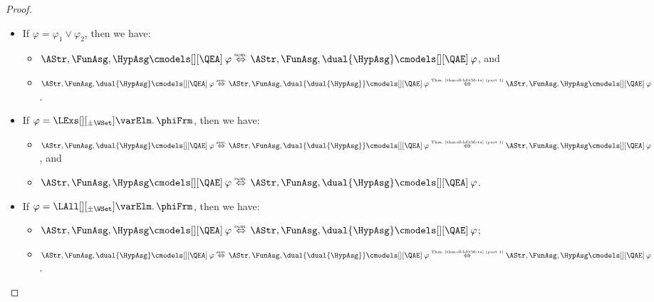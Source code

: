 \documentclass[authoryear]{elsarticle}
\newcommand{\iffExpl}[1]{\mathrel{\stackrel{\text{\tiny #1}}{\Leftrightarrow}}}
\begin{document}
\begin{proof}
\begin{itemize}
\begin{itemize}
    \end{itemize}

  \item If $\varphi = \varphi_1 \vee \varphi_2$, then we have:
    \begin{itemize}
    \item $\AStr, \FunAsg, \HypAsg \cmodels[][\QEA]\: \varphi \iffExpl{sem.}
      \AStr, \FunAsg, \dual{\HypAsg} \cmodels[][\QAE]\: \varphi$, and

    \item $\AStr, \FunAsg, \dual{\HypAsg} \cmodels[][\QEA]\: \varphi
      \iffExpl{sem.}  \AStr, \FunAsg, \dual{\dual{\HypAsg}} \cmodels[][\QAE]\:
      \varphi \iffExpl{Thm.~\ref{thm:dbldltMeta} (part 1)} \AStr, \FunAsg,
      \HypAsg \cmodels[][\QAE]\: \varphi$.

    \end{itemize}

  \item If $\varphi = \LExs[][_{\pm\WSet}] \varElm \ldotp \phiFrm$, then we
    have:
    \begin{itemize}
    \item $\AStr, \FunAsg, \dual{\HypAsg} \cmodels[][\QAE]\: \varphi
      \iffExpl{sem.}\AStr, \FunAsg, \dual{\dual{\HypAsg}} \cmodels[][\QEA]\:
      \varphi \iffExpl{Thm.~\ref{thm:dbldltMeta} (part 1)} \AStr, \FunAsg,
      \HypAsg \cmodels[][\QEA]\: \varphi$, and

    \item $\AStr, \FunAsg, \HypAsg \cmodels[][\QAE]\: \varphi \iffExpl{sem.}
      \AStr, \FunAsg, \dual{\HypAsg} \cmodels[][\QEA]\: \varphi$.
    \end{itemize}

  \item If $\varphi = \LAll[][_{\pm\WSet}] \varElm \ldotp \phiFrm$, then we
    have:
    \begin{itemize}
    \item $\AStr, \FunAsg, \HypAsg \cmodels[][\QEA]\: \varphi \iffExpl{sem.}
      \AStr, \FunAsg, \dual{\HypAsg} \cmodels[][\QAE]\: \varphi$;

    \item $\AStr, \FunAsg, \dual{\HypAsg} \cmodels[][\QEA]\: \varphi
      \iffExpl{sem.}  \AStr, \FunAsg, \dual{\dual{\HypAsg}} \cmodels[][\QAE]\:
      \varphi \iffExpl{Thm.~\ref{thm:dbldltMeta} (part 1)} \AStr, \FunAsg,
      \HypAsg \cmodels[][\QAE]\: \varphi$.
      \qedhere
    \end{itemize}
  \end{itemize}
\end{proof}
\end{document}
